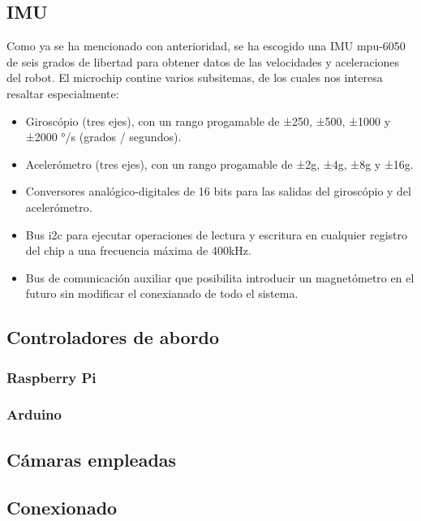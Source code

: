 \subsection{IMU}
Como ya se ha mencionado con anterioridad, se ha escogido una IMU mpu-6050 de seis grados de libertad para obtener datos de las velocidades y aceleraciones del robot. El microchip contine varios subsitemas, de los cuales nos interesa resaltar especialmente:
\begin{itemize}
	\item Giroscópio (tres ejes), con un rango progamable de ±250, ±500, ±1000 y ±2000 °/s (grados / segundos).
	\item Acelerómetro (tres ejes), con un rango progamable de ±2g, ±4g, ±8g y ±16g.
	\item Conversores analógico-digitales de 16 bits para las salidas del giroscópio y del acelerómetro.
	\item Bus i2c para ejecutar operaciones de lectura y escritura en cualquier registro del chip a una frecuencia máxima de 400kHz.
	\item Bus de comunicación auxiliar que posibilita introducir un magnetómetro en el futuro sin modificar el conexianado de todo el sistema.
\end{itemize}


\subsection{Controladores de abordo}
\subsubsection{Raspberry Pi}
\subsubsection{Arduino}
\subsection{Cámaras empleadas}
\subsection{Conexionado}